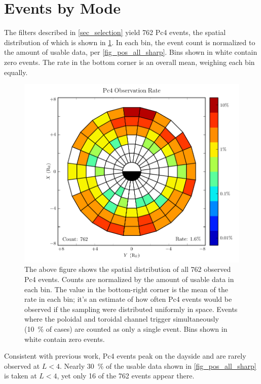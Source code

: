 \section{Events by Mode}
  \label{sec_rate}

The filters described in \cref{sec_selection} yield 762 Pc4 events, the spatial distribution of which is shown in \cref{fig_rate_all_sharp}. In each bin, the event count is normalized to the amount of usable data, per \cref{fig_pos_all_sharp}. Bins shown in white contain zero events. The rate in the bottom corner is an overall mean, weighing each bin equally. 

\begin{figure}[!htb]
    \centering
    \includegraphics[width=\textwidth]{figures/rate_all_sharp.pdf}
    \caption[Rate of Pc4 Events]{
      The above figure shows the spatial distribution of all 762 observed Pc4 events. Counts are normalized by the amount of usable data in each bin. The value in the bottom-right corner is the mean of the rate in each bin; it's an estimate of how often Pc4 events would be observed if the sampling were distributed uniformly in space. Events where the poloidal and toroidal channel trigger simultaneously (\about\SI{10}{\percent} of cases) are counted as only a single event. Bins shown in white contain zero events. 
    }
    \label{fig_rate_all_sharp}
\end{figure}

Consistent with previous work, Pc4 events peak on the dayside and are rarely observed at $L < 4$. Nearly \SI{30}{\percent} of the usable data shown in \cref{fig_pos_all_sharp} is taken at $L < 4$, yet only 16 of the 762 events appear there. 

